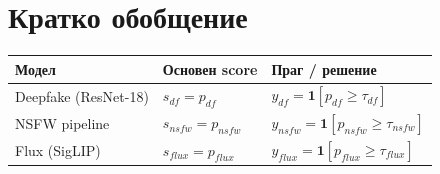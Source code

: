 \documentclass[12pt,a4paper]{article}
\begin{document}
\section{Кратко обобщение}

\begin{center}
\begin{tabular}{lll}
\toprule
\textbf{Модел} & \textbf{Основен score} & \textbf{Праг / решение} \\
\midrule
Deepfake (ResNet-18) & $s_{df}=p_{df}$ & $y_{df}=\mathbf{1}[p_{df}\ge\tau_{df}]$ \\
NSFW pipeline & $s_{nsfw}=p_{nsfw}$ & $y_{nsfw}=\mathbf{1}[p_{nsfw}\ge\tau_{nsfw}]$ \\
Flux (SigLIP) & $s_{flux}=p_{flux}$ & $y_{flux}=\mathbf{1}[p_{flux}\ge\tau_{flux}]$ \\
\bottomrule
\end{tabular}
\end{center}
\end{document}
